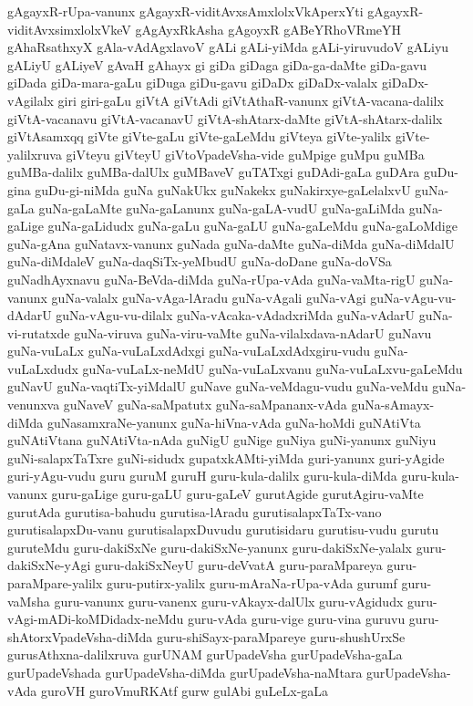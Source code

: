 {gAgayxR-rUpa-vanunx
gAgayxR-viditAvxsAmxlolxVkAperxYti
gAgayxR-viditAvxsimxlolxVkeV
gAgAyxRkAsha
gAgoyxR
gABeYRhoVRmeYH
gAhaRsathxyX
gAla-vAdAgxlavoV
gALi
gALi-yiMda
gALi-yiruvudoV
gALiyu
gALiyU
gALiyeV
gAvaH
gAhayx
gi
giDa
giDaga
giDa-ga-daMte
giDa-gavu
giDada
giDa-mara-gaLu
giDuga
giDu-gavu
giDaDx
giDaDx-valalx
giDaDx-vAgilalx
giri
giri-gaLu
giVtA
giVtAdi
giVtAthaR-vanunx
giVtA-vacana-dalilx
giVtA-vacanavu
giVtA-vacanavU
giVtA-shAtarx-daMte
giVtA-shAtarx-dalilx
giVtAsamxqq
giVte
giVte-gaLu
giVte-gaLeMdu
giVteya
giVte-yalilx
giVte-yalilxruva
giVteyu
giVteyU
giVtoVpadeVsha-vide
guMpige
guMpu
guMBa
guMBa-dalilx
guMBa-dalUlx
guMBaveV
guTATxgi
guDAdi-gaLa
guDAra
guDu-gina
guDu-gi-niMda
guNa
guNakUkx
guNakekx
guNakirxye-gaLelalxvU
guNa-gaLa
guNa-gaLaMte
guNa-gaLanunx
guNa-gaLA-vudU
guNa-gaLiMda
guNa-gaLige
guNa-gaLidudx
guNa-gaLu
guNa-gaLU
guNa-gaLeMdu
guNa-gaLoMdige
guNa-gAna
guNatavx-vanunx
guNada
guNa-daMte
guNa-diMda
guNa-diMdalU
guNa-diMdaleV
guNa-daqSiTx-yeMbudU
guNa-doDane
guNa-doVSa
guNadhAyxnavu
guNa-BeVda-diMda
guNa-rUpa-vAda
guNa-vaMta-rigU
guNa-vanunx
guNa-valalx
guNa-vAga-lAradu
guNa-vAgali
guNa-vAgi
guNa-vAgu-vu-dAdarU
guNa-vAgu-vu-dilalx
guNa-vAcaka-vAdadxriMda
guNa-vAdarU
guNa-vi-rutatxde
guNa-viruva
guNa-viru-vaMte
guNa-vilalxdava-nAdarU
guNavu
guNa-vuLaLx
guNa-vuLaLxdAdxgi
guNa-vuLaLxdAdxgiru-vudu
guNa-vuLaLxdudx
guNa-vuLaLx-neMdU
guNa-vuLaLxvanu
guNa-vuLaLxvu-gaLeMdu
guNavU
guNa-vaqtiTx-yiMdalU
guNave
guNa-veMdagu-vudu
guNa-veMdu
guNa-venunxva
guNaveV
guNa-saMpatutx
guNa-saMpananx-vAda
guNa-sAmayx-diMda
guNasamxraNe-yanunx
guNa-hiVna-vAda
guNa-hoMdi
guNAtiVta
guNAtiVtana
guNAtiVta-nAda
guNigU
guNige
guNiya
guNi-yanunx
guNiyu
guNi-salapxTaTxre
guNi-sidudx
gupatxkAMti-yiMda
guri-yanunx
guri-yAgide
guri-yAgu-vudu
guru
guruM
guruH
guru-kula-dalilx
guru-kula-diMda
guru-kula-vanunx
guru-gaLige
guru-gaLU
guru-gaLeV
gurutAgide
gurutAgiru-vaMte
gurutAda
gurutisa-bahudu
gurutisa-lAradu
gurutisalapxTaTx-vano
gurutisalapxDu-vanu
gurutisalapxDuvudu
gurutisidaru
gurutisu-vudu
gurutu
guruteMdu
guru-dakiSxNe
guru-dakiSxNe-yanunx
guru-dakiSxNe-yalalx
guru-dakiSxNe-yAgi
guru-dakiSxNeyU
guru-deVvatA
guru-paraMpareya
guru-paraMpare-yalilx
guru-putirx-yalilx
guru-mAraNa-rUpa-vAda
gurumf
guru-vaMsha
guru-vanunx
guru-vanenx
guru-vAkayx-dalUlx
guru-vAgidudx
guru-vAgi-mADi-koMDidadx-neMdu
guru-vAda
guru-vige
guru-vina
guruvu
guru-shAtorxVpadeVsha-diMda
guru-shiSayx-paraMpareye
guru-shushUrxSe
gurusAthxna-dalilxruva
gurUNAM
gurUpadeVsha
gurUpadeVsha-gaLa
gurUpadeVshada
gurUpadeVsha-diMda
gurUpadeVsha-naMtara
gurUpadeVsha-vAda
guroVH
guroVmuRKAtf
gurw
gulAbi
guLeLx-gaLa
}
